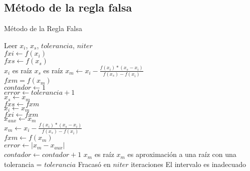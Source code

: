 \documentclass[12pt]{article}
\begin{document}
    \subsection{Método de la regla falsa}
    \begin{algorithm}[H]
        \caption{Método de la Regla Falsa}
        \SetAlgoLined
        Leer $x_i$, $x_s$, $tolerancia$, $niter$ \\
        $fxi \leftarrow f(x_i)$ \\
        $fxs \leftarrow f(x_s)$ \\
        {$x_i$ es raíz}
        {$x_s$ es raíz}
        {
            $x_m \leftarrow x_i - \frac{f(x_i)*(x_s - x_i)}{f(x_s) - f(x_i)}$\\
            $fxm = f(x_m)$\\
            $contador \leftarrow 1$\\
            $error \leftarrow tolerancia + 1$ \\
            {
                {$x_s \leftarrow x_m$\\
                    $fxs \leftarrow fxm$\\}
                {$x_i \leftarrow x_m$\\
                    $fxi \leftarrow fxm$\\}
                $x_{aux} \leftarrow x_m$\\
                $x_m \leftarrow x_i - \frac{f(x_i)*(x_s - x_i)}{f(x_s) - f(x_i)}$\\
                $fxm \leftarrow f(x_m)$\\
                $error \leftarrow |x_m - x_{aux}|$\\
                $contador \leftarrow contador + 1$
            }
            {$x_m$ es raíz}
            {$x_m$ es aproximación a una raíz con una tolerancia = $tolerancia$}
            \Else
            {Fracasó en $niter$ iteraciones}
        }
        \Else
        {El intervalo es inadecuado}
    \end{algorithm}
\end{document}
